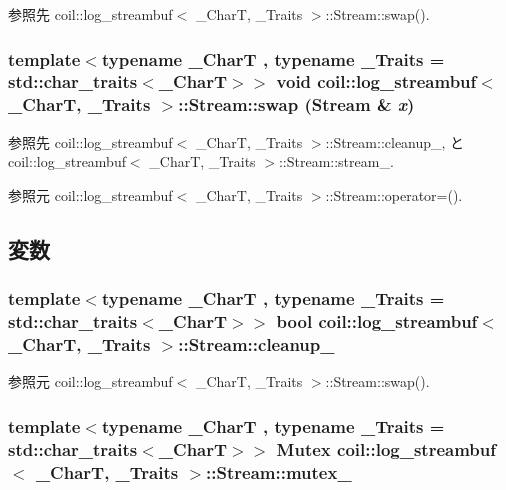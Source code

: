 参照先 coil::log\_\-streambuf$<$ \_\-CharT, \_\-Traits $>$::Stream::swap().

\subsubsection[{swap}]{\setlength{\rightskip}{0pt plus 5cm}template$<$typename \_\-CharT , typename \_\-Traits  = std::char\_\-traits$<$\_\-CharT$>$$>$ void {\bf coil::log\_\-streambuf}$<$ \_\-CharT, \_\-Traits $>$::Stream::swap ({\bf Stream} \& {\em x})\hspace{0.3cm}{\ttfamily  [inline]}}\label{structcoil_1_1log__streambuf_1_1Stream_a45057b9b7e72935f76194ffa72b395c2}


参照先 coil::log\_\-streambuf$<$ \_\-CharT, \_\-Traits $>$::Stream::cleanup\_\-, と coil::log\_\-streambuf$<$ \_\-CharT, \_\-Traits $>$::Stream::stream\_\-.



参照元 coil::log\_\-streambuf$<$ \_\-CharT, \_\-Traits $>$::Stream::operator=().



\subsection{変数}
\subsubsection[{cleanup\_\-}]{\setlength{\rightskip}{0pt plus 5cm}template$<$typename \_\-CharT , typename \_\-Traits  = std::char\_\-traits$<$\_\-CharT$>$$>$ bool {\bf coil::log\_\-streambuf}$<$ \_\-CharT, \_\-Traits $>$::{\bf Stream::cleanup\_\-}}\label{structcoil_1_1log__streambuf_1_1Stream_a673577f0750a576f536a5ad4572057a1}


参照元 coil::log\_\-streambuf$<$ \_\-CharT, \_\-Traits $>$::Stream::swap().

\subsubsection[{mutex\_\-}]{\setlength{\rightskip}{0pt plus 5cm}template$<$typename \_\-CharT , typename \_\-Traits  = std::char\_\-traits$<$\_\-CharT$>$$>$ {\bf Mutex} {\bf coil::log\_\-streambuf}$<$ \_\-CharT, \_\-Traits $>$::{\bf Stream::mutex\_\-}\hspace{0.3cm}{\ttfamily  [mutable]}}\label{structcoil_1_1log__streambuf_1_1Stream_aeadb126688858c2934096affbcb9721a}

